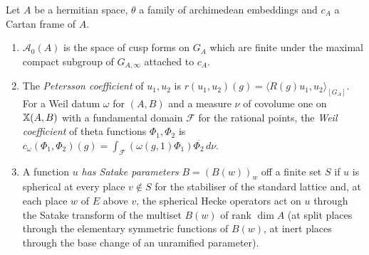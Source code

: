 \begin{definition}\label{pf:liftinj:coefdef}
Let $A$ be a hermitian space, $\theta$ a family of archimedean embeddings and $c_A$ a Cartan frame of $A$.
\begin{enumerate}[label=(\alph*)]
\item $\mathcal A_0(A)$ is the space of cusp forms on $G_A$ which are finite under the maximal compact subgroup of $G_{A,\infty}$
attached to $c_A$.
\item The \emph{Petersson coefficient} of $u_1,u_2$ is $r(u_1,u_2)(g)=\langle R(g)u_1,u_2\rangle_{[G_A]}$. For a Weil datum $\omega$ for
$(A,B)$ and a measure $\nu$ of covolume one on $\mathbb{X}(A,B)$ with a fundamental domain $\mathcal F$ for the rational points, the
\emph{Weil coefficient} of theta functions $\Phi_1,\Phi_2$ is
$c_\omega(\Phi_1,\Phi_2)(g)=\int_{\mathcal F}(\omega(g,1)\Phi_1)\overline{\Phi_2}\,d\nu$.
\item A function $u$ \emph{has Satake parameters} $B=(B(w))_w$ off a finite set $S$ if $u$ is spherical at every place $v\notin S$ for the
stabiliser of the standard lattice and, at each place $w$ of $E$ above $v$, the spherical Hecke operators act on $u$ through the
Satake transform of the multiset $B(w)$ of rank $\dim A$ (at split places through the elementary symmetric functions of $B(w)$, at
inert places through the base change of an unramified parameter).
\end{enumerate}
\end{definition}

